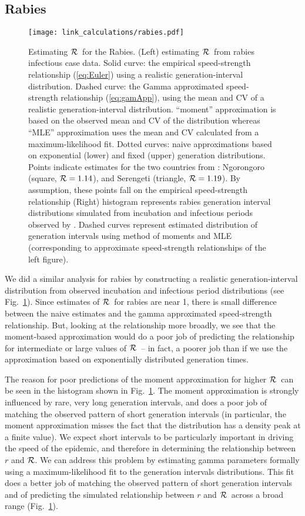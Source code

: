 \documentclass[12pt]{article}
\newcommand{\RR}{\ensuremath{{\cal R}}}
\newcommand{\eref}[1]{(\ref{eq:#1})}
\newcommand{\fref}[1]{Fig.~\ref{fig:#1}}
\begin{document}
\subsection{Rabies}
\label{Rabies_example}

\begin{figure}[htbp] \centering
	\texttt{[image: link\_calculations/rabies.pdf]}
	\caption{Estimating \RR~for the Rabies.
	    (Left) estimating \RR~from rabies infectious case data.
		Solid curve: the empirical speed-strength relationship \eref{Euler} using a realistic generation-interval distribution.
Dashed curve: the Gamma approximated speed-strength relationship \eref{gamApp}, using the mean and CV of a realistic generation-interval distribution. 
        ``moment'' approximation is based on the observed mean and CV of the distribution whereas ``MLE'' approximation uses the mean and CV calculated from a maximum-likelihood fit.
		Dotted curves: naive approximations based on exponential (lower) and fixed (upper) generation distributions.
		Points indicate estimates for the two countries from \cite{HampDush09}: {Ngorongoro (square, $\RR=1.14$), and Serengeti (triangle, $\RR=1.19$). By assumption, these points fall on the empirical speed-strength relationship}
		(Right) histogram represents rabies generation interval distributions simulated from incubation and infectious periods observed by \cite{HampDush09}.
		Dashed curves represent estimated distribution of generation intervals using method of moments and MLE (corresponding to approximate speed-strength relationships of the left figure). 
	}
	\label{fig:rabiesCurve}
\end{figure}

We did a similar analysis for rabies by constructing a realistic generation-interval distribution from observed incubation and infectious period distributions (see \fref{rabiesCurve}).
Since estimates of \RR\ for rabies are near 1, there is small difference between the naive estimates and the gamma approximated speed-strength relationship. 
But, looking at the relationship more broadly, we see that the moment-based approximation would do a poor job of predicting the relationship for intermediate or large values of \RR\ -- in fact, a poorer job than if we use the approximation based on exponentially distributed generation times. 

The reason for poor predictions of the moment approximation for higher \RR\ can be seen in the histogram shown in \fref{rabiesCurve}. The moment approximation is strongly influenced by rare, very long generation intervals, and does a poor job of matching the observed pattern of short generation intervals (in particular, the moment approximation misses the fact that the distribution has a density peak at a finite value). We expect short intervals to be particularly important in driving the speed of the epidemic, and therefore in determining the relationship between $r$ and \RR. We can address this problem by estimating gamma parameters formally using a maximum-likelihood fit to the generation intervals distributions. This fit does a better job of matching the observed pattern of short generation intervals and of predicting the simulated relationship between $r$ and \RR\ across a broad range (\fref{rabiesCurve}).
\end{document}
